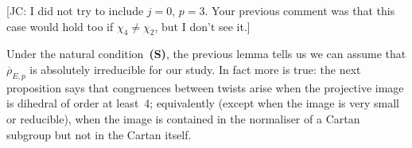 \documentclass[12pt, reqno]{amsart}
\newcommand{\rhobar}{{\overline{\rho}}}
\numberwithin{equation}{section}
\newtheorem{corollary}[theorem]{Corollary}
\theoremstyle{definition}
\theoremstyle{remark}
\newcommand{\jc}[1]{{\color{darkgreen} \textsf{[JC: #1]}}}
\begin{document}
\jc{I did not try to include $j=0$, $p=3$.  Your previous comment was
  that this case would hold too if $\chi_4\not=\chi_2$, but I don't
  see it.}

\begin{comment}
\begin{corollary}\label{C:noCyclic}
 Let $E/K$ be an elliptic curve with $j(E) \neq 0$. Let $p \geq 3$ be a prime.
Assume $E[p]$ satisfies condition~{\bf (S)} and is $p$-congruent to a twist. Then~$\rhobar_{E,p}$ is absolutely irreducibile.
\end{corollary}
\end{comment}

Under the natural condition~{\bf (S)}, the previous lemma tells us we
can assume that $\rhobar_{E,p}$ is absolutely irreducible for our
study. In fact more is true: the next proposition says that
congruences between twists arise when the projective image is dihedral
of order at least~4; equivalently (except when the image is very small
or reducible), when the image is contained in the normaliser of a
Cartan subgroup but not in the Cartan itself.
\end{document}
